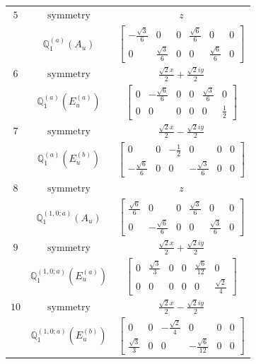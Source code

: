 \documentclass[fleqn,8pt,landscape]{jsarticle}
\begin{document}
\begin{longtable}{ccc}
$ 5 $ & $ \text{symmetry} $ & $ z $ \\
$  $ & $ \mathbb{Q}_{1}^{(a)}(A_{u}) $ & $ \begin{bmatrix} - \frac{\sqrt{3}}{6} & 0 & 0 & \frac{\sqrt{6}}{6} & 0 & 0 \\ 0 & \frac{\sqrt{3}}{6} & 0 & 0 & \frac{\sqrt{6}}{6} & 0 \end{bmatrix} $ \\ \hline
$ 6 $ & $ \text{symmetry} $ & $ \frac{\sqrt{2} x}{2} + \frac{\sqrt{2} i y}{2} $ \\
$  $ & $ \mathbb{Q}_{1}^{(a)}(E_{u}^{(a)}) $ & $ \begin{bmatrix} 0 & - \frac{\sqrt{6}}{6} & 0 & 0 & \frac{\sqrt{3}}{6} & 0 \\ 0 & 0 & 0 & 0 & 0 & \frac{1}{2} \end{bmatrix} $ \\ \hline
$ 7 $ & $ \text{symmetry} $ & $ \frac{\sqrt{2} x}{2} - \frac{\sqrt{2} i y}{2} $ \\
$  $ & $ \mathbb{Q}_{1}^{(a)}(E_{u}^{(b)}) $ & $ \begin{bmatrix} 0 & 0 & - \frac{1}{2} & 0 & 0 & 0 \\ - \frac{\sqrt{6}}{6} & 0 & 0 & - \frac{\sqrt{3}}{6} & 0 & 0 \end{bmatrix} $ \\ \hline
$ 8 $ & $ \text{symmetry} $ & $ z $ \\
$  $ & $ \mathbb{Q}_{1}^{(1,0;a)}(A_{u}) $ & $ \begin{bmatrix} \frac{\sqrt{6}}{6} & 0 & 0 & \frac{\sqrt{3}}{6} & 0 & 0 \\ 0 & - \frac{\sqrt{6}}{6} & 0 & 0 & \frac{\sqrt{3}}{6} & 0 \end{bmatrix} $ \\ \hline
$ 9 $ & $ \text{symmetry} $ & $ \frac{\sqrt{2} x}{2} + \frac{\sqrt{2} i y}{2} $ \\
$  $ & $ \mathbb{Q}_{1}^{(1,0;a)}(E_{u}^{(a)}) $ & $ \begin{bmatrix} 0 & \frac{\sqrt{3}}{3} & 0 & 0 & \frac{\sqrt{6}}{12} & 0 \\ 0 & 0 & 0 & 0 & 0 & \frac{\sqrt{2}}{4} \end{bmatrix} $ \\ \hline
$ 10 $ & $ \text{symmetry} $ & $ \frac{\sqrt{2} x}{2} - \frac{\sqrt{2} i y}{2} $ \\
$  $ & $ \mathbb{Q}_{1}^{(1,0;a)}(E_{u}^{(b)}) $ & $ \begin{bmatrix} 0 & 0 & - \frac{\sqrt{2}}{4} & 0 & 0 & 0 \\ \frac{\sqrt{3}}{3} & 0 & 0 & - \frac{\sqrt{6}}{12} & 0 & 0 \end{bmatrix} $ \\ \hline

\end{longtable}
\end{document}
